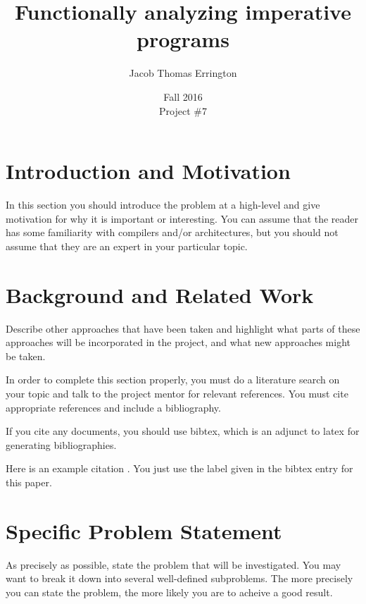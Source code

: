 \documentclass{article}
\title{Functionally analyzing imperative programs}
\date{Fall 2016\\Project \#7}
\author{Jacob Thomas Errington}
\begin{document}
\maketitle

\clearpage

\tableofcontents

\listoffigures %
\listoftables  %

\clearpage


\section{Introduction and Motivation}

In this section you should introduce the problem at a high-level and give
motivation for why it is important or interesting.   You can assume that
the reader has some familiarity with compilers and/or architectures, but
you should not assume that they are an expert in your particular topic.

\section{Background and Related Work}

Describe other approaches that have been taken and highlight what parts
of these approaches will be incorporated in the project, and what new
approaches might be taken.

In order to complete this section properly, you must do a literature
search on your topic and talk to the project mentor for relevant references.
You must cite appropriate references and include a bibliography.

If you cite any documents, you should use bibtex, which is an adjunct to
latex for generating bibliographies.  

Here is an example citation \cite{POPL::DeFouwGC1998}.   You just use the 
label given in the bibtex entry for this paper.   

\section{Specific Problem Statement}

As precisely as possible, state the problem that will be investigated.
You may want to break it down into several well-defined subproblems.
The more precisely you can state the problem, the more likely you are
to acheive a good result.
\end{document}
